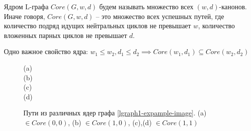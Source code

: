 Ядром L-графа $Core(G, w, d)$ будем называть множество всех $(w,d)$-канонов. 
Иначе говоря, $Core(G, w, d)$ -- это множество всех успешных путей, 
где количество подряд идущих нейтральных циклов не превышает  $w$, 
количество вложенных парных циклов не превышает $d$.  

Одно важное свойство ядра: $w_1 \leq w_2, d_1 \leq d_2 \implies Core(w_1, d_1) \subseteq Core(w_2, d_2)$

\begin{figure}[h]
    \centering
     (a)\\
     (b)\\
     (c)\\
     (d)\\
    
    \caption{Пути из различных ядер графа \ref{lgraph1-expample-image}. (a) $\in Core(0,0)$, (b) $\in Core(1,0)$, (c),(d) $\in Core(1,1)$}
    \label{lgraph1-core-example}
\end{figure}


\clearpage